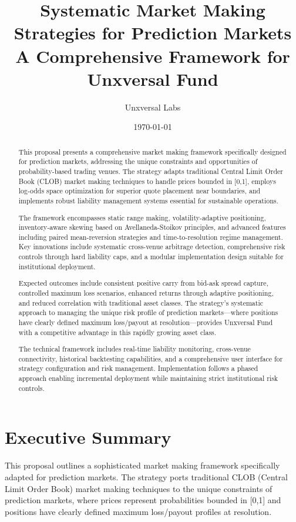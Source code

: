 \documentclass[11pt]{article}
\title{\vspace{2.5in}Systematic Market Making Strategies for Prediction Markets\\[0.5em]\large A Comprehensive Framework for Unxversal Fund}
\author{Unxversal Labs}
\date{\today}
\begin{document}
\maketitle
\thispagestyle{empty}

\newpage
\begin{abstract}
This proposal presents a comprehensive market making framework specifically designed for prediction markets, addressing the unique constraints and opportunities of probability-based trading venues. The strategy adapts traditional Central Limit Order Book (CLOB) market making techniques to handle prices bounded in [0,1], employs log-odds space optimization for superior quote placement near boundaries, and implements robust liability management systems essential for sustainable operations.

The framework encompasses static range making, volatility-adaptive positioning, inventory-aware skewing based on Avellaneda-Stoikov principles, and advanced features including paired mean-reversion strategies and time-to-resolution regime management. Key innovations include systematic cross-venue arbitrage detection, comprehensive risk controls through hard liability caps, and a modular implementation design suitable for institutional deployment.

Expected outcomes include consistent positive carry from bid-ask spread capture, controlled maximum loss scenarios, enhanced returns through adaptive positioning, and reduced correlation with traditional asset classes. The strategy's systematic approach to managing the unique risk profile of prediction markets—where positions have clearly defined maximum loss/payout at resolution—provides Unxversal Fund with a competitive advantage in this rapidly growing asset class.

The technical framework includes real-time liability monitoring, cross-venue connectivity, historical backtesting capabilities, and a comprehensive user interface for strategy configuration and risk management. Implementation follows a phased approach enabling incremental deployment while maintaining strict institutional risk controls.
\end{abstract}
\thispagestyle{empty}

\newpage
\setcounter{page}{1}

\section{Executive Summary}

This proposal outlines a sophisticated market making framework specifically adapted for prediction markets. The strategy ports traditional CLOB (Central Limit Order Book) market making techniques to the unique constraints of prediction markets, where prices represent probabilities bounded in [0,1] and positions have clearly defined maximum loss/payout profiles at resolution.
\end{document}

